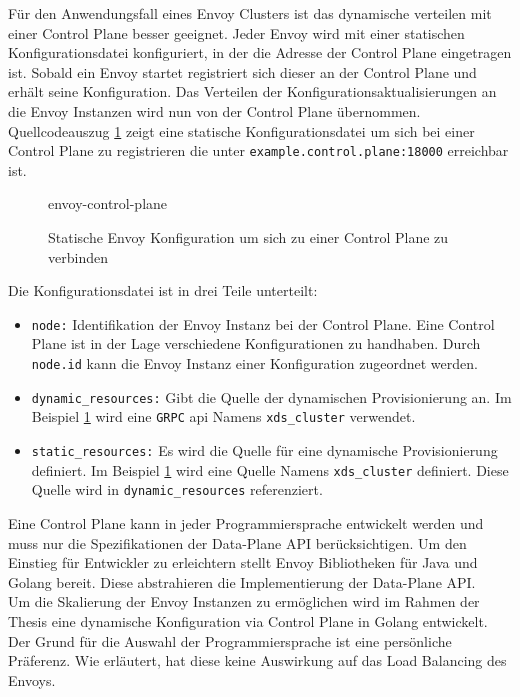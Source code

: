 Für den Anwendungsfall eines Envoy Clusters ist das dynamische verteilen mit einer Control Plane besser geeignet. Jeder Envoy wird mit einer statischen Konfigurationsdatei konfiguriert, in der die Adresse der Control Plane eingetragen ist. Sobald ein Envoy startet registriert sich dieser an der Control Plane und erhält seine Konfiguration. Das Verteilen der Konfigurationsaktualisierungen an die Envoy Instanzen wird nun von der Control Plane übernommen.
\\
Quellcodeauszug \ref{code:envoy-control-plane} zeigt eine statische Konfigurationsdatei um sich bei einer Control Plane zu registrieren die unter \verb|example.control.plane:18000| erreichbar ist.
\begin{figure}
    {envoy-control-plane}
    \caption{Statische Envoy Konfiguration um sich zu einer Control Plane zu verbinden}
    \label{code:envoy-control-plane}
\end{figure}
Die Konfigurationsdatei ist in drei Teile unterteilt:
\begin{itemize}
  \item \verb|node:| Identifikation der Envoy Instanz bei der Control Plane. Eine Control Plane ist in der Lage verschiedene Konfigurationen zu handhaben. Durch \verb|node.id| kann die Envoy Instanz einer Konfiguration zugeordnet werden.
  \item \verb|dynamic_resources:| Gibt die Quelle der dynamischen Provisionierung an. Im Beispiel \ref{code:envoy-control-plane} wird eine \verb|GRPC| \ac{api} Namens \verb|xds_cluster| verwendet.
  \item \verb|static_resources:| Es wird die Quelle für eine dynamische Provisionierung definiert. Im Beispiel \ref{code:envoy-control-plane} wird eine Quelle Namens \verb|xds_cluster| definiert. Diese Quelle wird in \verb|dynamic_resources| referenziert.
\end{itemize}
Eine Control Plane kann in jeder Programmiersprache entwickelt werden und muss nur die Spezifikationen der Data-Plane API \cite{EnvoyproxyDataplaneapi2021} berücksichtigen. Um den Einstieg für Entwickler zu erleichtern stellt Envoy Bibliotheken für Java und Golang bereit. Diese abstrahieren die Implementierung der Data-Plane API.
\\
Um die Skalierung der Envoy Instanzen zu ermöglichen wird im Rahmen der Thesis eine dynamische Konfiguration via Control Plane in Golang entwickelt. Der Grund für die Auswahl der Programmiersprache ist eine persönliche Präferenz. Wie erläutert, hat diese keine Auswirkung auf das Load Balancing des Envoys.

